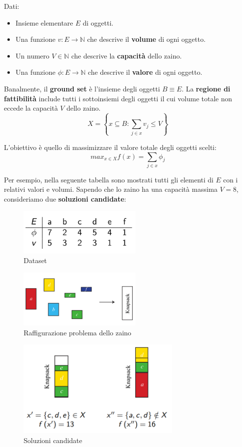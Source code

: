 \documentclass{article}
\begin{document}
Dati:
\begin{itemize}
    \item Insieme elementare $E$ di oggetti.
    \item Una funzione $v:E\rightarrow \mathbb{N}$ che descrive il \textbf{volume} di ogni oggetto.
    \item Un numero $V\in \mathbb{N}$ che descrive la \textbf{capacità} dello zaino.
    \item Una funzione $\phi : E\rightarrow \mathbb{N}$ che descrive il \textbf{valore} di ogni oggetto.
\end{itemize}

Banalmente, il \textbf{ground set} è l'insieme degli oggetti $B\equiv E$. La \textbf{regione di fattibilità} include tutti i sottoinsiemi degli
oggetti il cui volume totale non eccede la capacità $V$ dello zaino.
$$X=\left\{x\subseteq B : \sum_{j\in x}v_j \leq V\right\}$$

L'obiettivo è quello di massimizzare il valore totale degli oggetti scelti:
$$max_{x\in X} f(x)=\sum_{j\in x}\phi_j$$

Per esempio, nella seguente tabella sono mostrati tutti gli elementi di $E$ con i relativi valori e volumi. Sapendo che lo zaino ha una capacità massima $V=8$, consideriamo due \textbf{soluzioni candidate}:

\begin{figure}[H]
    \centering
    \includegraphics[width=6cm]{images/tab_KP.png}
    \caption{Dataset}
    \label{fig:tab_KP}
\end{figure}

\begin{figure}[H]
    \centering
    \includegraphics[width=6cm]{images/graphic_KP.png}
    \caption{Raffigurazione problema dello zaino}
    \label{fig:graphic_KP}
\end{figure}

\begin{figure}[H]
    \centering
    \includegraphics[width=8cm]{images/cand_sol_KP.png}
    \caption{Soluzioni candidate}
    \label{fig:cand_sol_KP}
\end{figure}
\end{document}
